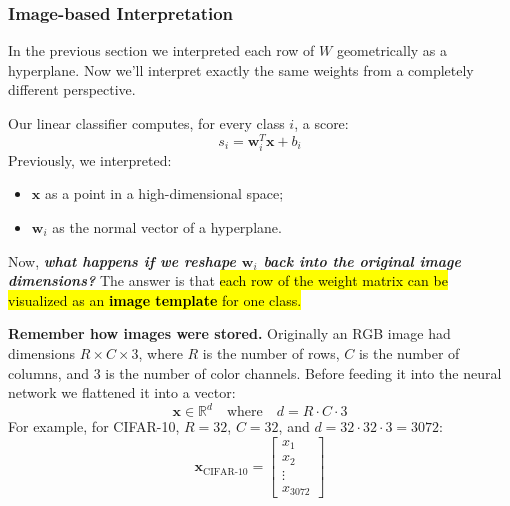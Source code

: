 \subsubsection{Image-based Interpretation}\label{sec:image-based-interpretation}

In the previous section we interpreted each row of $W$ geometrically as a hyperplane. Now we'll interpret exactly the same weights from a completely different perspective.

\highspace
Our linear classifier computes, for every class $i$, a score:
\begin{equation*}
    s_i = \mathbf{w}_{i}^{T} \mathbf{x} + b_i
\end{equation*}
Previously, we interpreted:
\begin{itemize}
    \item $\mathbf{x}$ as a point in a high-dimensional space;
    \item $\mathbf{w}_i$ as the normal vector of a hyperplane.
\end{itemize}
Now, \emph{\textbf{what happens if we reshape $\mathbf{w}_i$ back into the original image dimensions?}} The answer is that \hl{each row of the weight matrix can be visualized as an \textbf{image template} for one class.}

\highspace
\textcolor{Green3}{ \textbf{Remember how images were stored.}} Originally an RGB image had dimensions $R \times C \times 3$, where $R$ is the number of rows, $C$ is the number of columns, and $3$ is the number of color channels. Before feeding it into the neural network we flattened it into a vector:
\begin{equation*}
    \mathbf{x} \in \mathbb{R}^{d} \quad \text{where} \quad d = R \cdot C \cdot 3
\end{equation*}
For example, for CIFAR-10, $R = 32$, $C = 32$, and $d = 32 \cdot 32 \cdot 3 = 3072$:
\begin{equation*}
    \mathbf{x}_{\text{CIFAR-10}} = \begin{bmatrix}
        x_1 \\
        x_2 \\
        \vdots \\
        x_{3072}
    \end{bmatrix}
\end{equation*}

